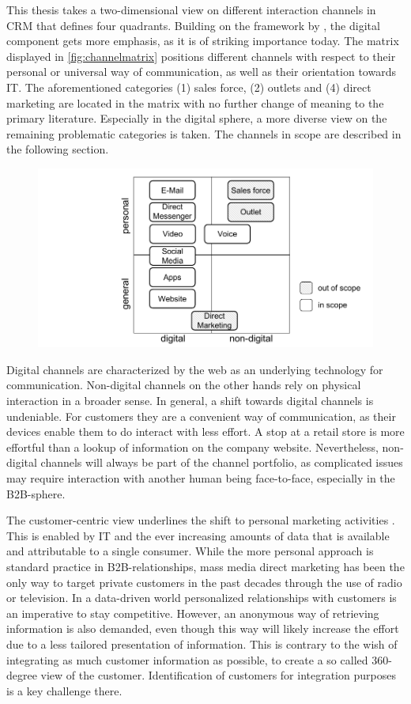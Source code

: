 		This thesis takes a two-dimensional view on different interaction channels in CRM that defines four quadrants. Building on the framework by \citeauthor{paynefrow2005}, the digital component gets more emphasis, as it is of striking importance today. The matrix displayed in \ref{fig:channelmatrix} positions different channels with respect to their personal or universal way of communication, as well as their orientation towards IT. The aforementioned categories (1) sales force, (2) outlets and (4) direct marketing are located in the matrix with no further change of meaning to the primary literature. Especially in the digital sphere, a more diverse view on the remaining problematic categories is taken. The channels in scope are described in the following section. 
		
			\begin{figure}[caption={Channel matrix}, label={fig:channelmatrix}]
			{	\includegraphics[width=.8\textwidth]{figures/channelmatrix.pdf}}
		\end{figure}
		
		Digital channels are characterized by the web as an underlying technology for communication. Non-digital channels on the other hands rely on physical interaction in a broader sense. In general, a shift towards digital channels is undeniable. For customers they are a convenient way of communication, as their devices enable them to do interact with less effort. A stop at a retail store is more effortful than a lookup of information on the company website. Nevertheless, non-digital channels will always be part of the channel portfolio, as complicated issues may require interaction with another human being face-to-face, especially in the B2B-sphere. 
		
		The customer-centric view underlines the shift to personal marketing activities \citep{peppers}. This is enabled by IT and the ever increasing amounts of data that is available and attributable to a single consumer. While the more personal approach is standard practice in B2B-relationships, mass media direct marketing has been the only way to target private customers in the past decades through the use of radio or television. In a data-driven world personalized relationships with customers is an imperative to stay competitive. However, an anonymous way of retrieving information is also demanded, even though this way will likely increase the effort due to a less tailored presentation of information. This is contrary to the wish of integrating as much customer information as possible, to create a so called 360-degree view of the customer. Identification of customers for integration purposes is a key challenge there. 
		
